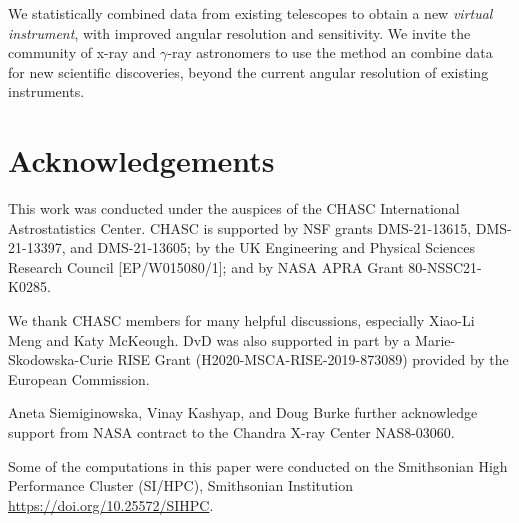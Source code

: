 \documentclass[twocolumn]{aastex631}
\newcommand{\gammaray}{$\gamma$-ray\xspace}
\begin{document}
  

    We statistically combined data from existing telescopes to obtain a new \textit{virtual instrument}, with improved angular resolution and sensitivity. We invite the community of x-ray and \gammaray astronomers to use the method an combine data for new scientific discoveries, beyond the current angular resolution of existing instruments.

    \section*{Acknowledgements}
    This work was conducted under the auspices of the CHASC International Astrostatistics Center.
    CHASC is supported by NSF grants DMS-21-13615, DMS-21-13397, and DMS-21-13605; by the UK Engineering
    and Physical Sciences Research Council [EP/W015080/1]; and by NASA APRA Grant 80-NSSC21-K0285.
    
    We thank CHASC members for many helpful discussions, especially Xiao-Li Meng and Katy McKeough.
    DvD was also supported in part by a Marie-Skodowska-Curie RISE Grant (H2020-MSCA-RISE-2019-873089)
    provided by the European Commission.
    
    Aneta Siemiginowska, Vinay Kashyap, and Doug Burke further acknowledge support from NASA
    contract to the Chandra X-ray Center NAS8-03060.

    Some of the computations in this paper were conducted on the Smithsonian High Performance
    Cluster (SI/HPC), Smithsonian Institution \url{https://doi.org/10.25572/SIHPC}.

    \newpage
    
\end{document}
